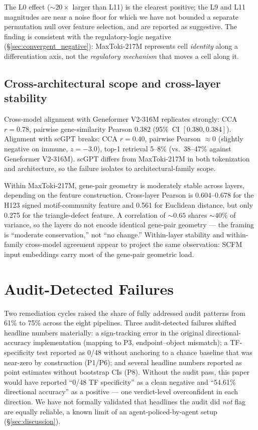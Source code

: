 \documentclass{article}
\newcommand{\maxtoki}{MaxToki-217M\xspace}
\newcommand{\geneformer}{Geneformer V2-316M\xspace}
\newcommand{\scfm}{SCFM\xspace}
\begin{document}
The L0 effect ($\sim$$20\times$ larger than L11) is the clearest
positive; the L9 and L11 magnitudes are near a noise floor for
which we have not bounded a separate permutation null over feature
selection, and are reported as suggestive. The finding is
consistent with the regulatory-logic negative
(\S\ref{sec:convergent_negative}): \maxtoki{} represents cell
\emph{identity} along a differentiation axis, not the
\emph{regulatory mechanism} that moves a cell along it.

\subsection{Cross-architectural scope and cross-layer stability}
\label{sec:cross_model}
\label{sec:cross_layer}

Cross-model alignment with \geneformer{} replicates strongly: CCA
$r{=}0.78$, pairwise gene-similarity Pearson $0.382$ (95\%~CI
$[0.380, 0.384]$). Alignment with scGPT breaks: CCA $r{=}0.40$,
pairwise Pearson $\approx 0$ (slightly negative on immune,
$z{=}{-}3.0$), top-1 retrieval 5--8\% (vs.~38--47\% against
\geneformer{}). scGPT differs from \maxtoki{} in both tokenization
and architecture, so the failure isolates to
architectural-family scope.

Within \maxtoki{}, gene-pair geometry is moderately stable across
layers, depending on the feature construction. Cross-layer Pearson
is 0.604--0.678 for the H123 signed motif-community feature and
0.561 for Euclidean distance, but only 0.275 for the
triangle-defect feature. A correlation of $\sim$$0.65$ shares
$\sim$$40\%$ of variance, so the layers do not encode identical
gene-pair geometry --- the framing is ``moderate conservation,''
not ``no change.'' Within-layer stability and within-family
cross-model agreement appear to project the same observation:
\scfm{} input embeddings carry most of the gene-pair geometric
load.

\section{Audit-Detected Failures}
\label{sec:audit_findings}

Two remediation cycles raised the share of fully addressed audit
patterns from 61\% to 75\% across the eight pipelines. Three
audit-detected failures shifted headline numbers materially:
a sign-tracking error in the original directional-accuracy
implementation (mapping to P3, endpoint--object mismatch); a
TF-specificity test reported as 0/48 without anchoring to a chance
baseline that was near-zero by construction (P1/P6); and several
headline numbers reported as point estimates without bootstrap CIs
(P8). Without the audit pass, this paper would have reported
``0/48 TF specificity'' as a clean negative and ``54.61\%
directional accuracy'' as a positive --- one verdict-level
overconfident in each direction. We have not formally validated
that headlines the audit did \emph{not} flag are equally reliable,
a known limit of an agent-policed-by-agent setup
(\S\ref{sec:discussion}).
\end{document}
